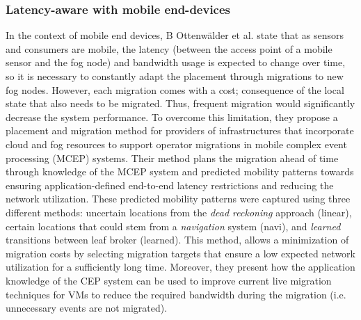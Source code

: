 \subsubsection{Latency-aware with mobile end-devices}
\noindent\tab In the context of mobile end devices, B Ottenwälder et al. \cite{ottenwalder2013migcep} state that as sensors and consumers are mobile, the latency (between the access point of a mobile sensor and the fog node) and bandwidth usage is expected to change over time, so it is necessary to constantly adapt the placement through migrations to new fog nodes. However, each migration comes with a cost; consequence of the local state that also needs to be migrated. Thus, frequent migration would significantly decrease the system performance. To overcome this limitation, they propose a placement and migration method for providers of infrastructures that incorporate cloud and fog resources to support operator migrations in mobile complex event processing (MCEP) systems. Their method plans the migration ahead of time through knowledge of the MCEP system and predicted mobility patterns towards ensuring application-defined end-to-end latency restrictions and reducing the network utilization. These predicted mobility patterns were captured using three different methods: uncertain locations from the \textit{dead reckoning} approach (linear), certain locations that could stem from a \textit{navigation} system (navi), and \textit{learned} transitions between leaf broker (learned). This method, allows a minimization of migration costs by selecting migration targets that ensure a low expected network utilization for a sufficiently long time. Moreover, they present how the application knowledge of the CEP system can be used to improve current live migration techniques for VMs to reduce the required bandwidth during the migration (i.e. unnecessary events are not migrated).\\

